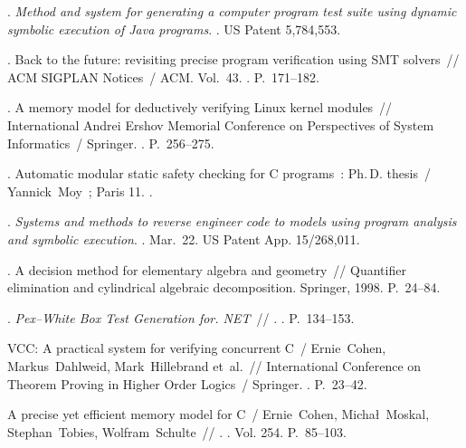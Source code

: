 \begin{thebibliography}{32}
. \textit{Method and system for
  generating a computer program test suite using dynamic symbolic execution of
  Java programs}. \BibDash
{}. \BibDash
\newblock US Patent 5,784,553.

. Back to the future: revisiting precise
  program verification using SMT solvers~// ACM SIGPLAN Notices~/ ACM. \BibDash
\newblock Vol.~43. \BibDash
{}. \BibDash
\newblock P.~171--182.

. A memory model for deductively
  verifying Linux kernel modules~// International Andrei Ershov Memorial
  Conference on Perspectives of System Informatics~/ Springer. \BibDash
{}. \BibDash
\newblock P.~256--275.

. Automatic modular static safety checking for C
  programs~: Ph.\,D. thesis~/ Yannick~Moy~; Paris 11. \BibDash
{}.

. \textit{Systems and methods to reverse engineer code to
  models using program analysis and symbolic execution}. \BibDash
{}. \BibDash Mar.~22. \BibDash
\newblock US Patent App. 15/268,011.

. A decision method for elementary algebra and
  geometry~// Quantifier elimination and cylindrical algebraic decomposition.
  \BibDash
\newblock Springer, 1998. \BibDash
\newblock P.~24--84.

. \textit{Pex--White Box Test
  Generation for. NET}~// . \BibDash
{}. \BibDash
\newblock P.~134--153.

VCC: A practical system for verifying concurrent C~/ Ernie~Cohen,
  Markus~Dahlweid, Mark~Hillebrand et~al.~// International Conference on
  Theorem Proving in Higher Order Logics~/ Springer. \BibDash
{}. \BibDash
\newblock P.~23--42.

A precise yet efficient memory model for C~/ Ernie~Cohen, Micha{\l}~Moskal,
  Stephan~Tobies, Wolfram~Schulte~// . \BibDash
{}. \BibDash
\newblock Vol. 254. \BibDash
\newblock P.~85--103.


\end{thebibliography}
